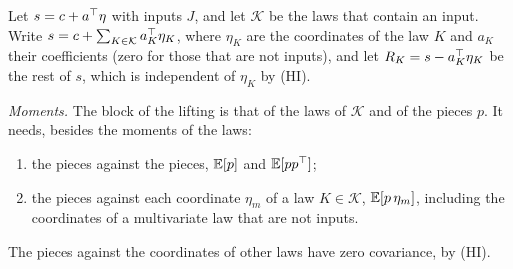 \documentclass[11pt,a4paper]{article}
\numberwithin{equation}{section}
\newcommand{\Hyp}[1]{\textup{(H#1)}}    %
\begin{document}
Let $s = c + a^\top\eta$ with inputs $J$, and let $\mathcal{K}$ be the laws that contain an input.
Write $s = c + \sum_{K \in \mathcal{K}} a_K^\top\eta_K$, where $\eta_K$ are the coordinates of the law $K$ and $a_K$ their coefficients (zero for those that are not inputs),
and let $R_K = s - a_K^\top\eta_K$ be the rest of $s$, which is independent of $\eta_K$ by \Hyp{I}.

\emph{Moments.} The block of the lifting is that of the laws of $\mathcal{K}$ and of the pieces $p$.
It needs, besides the moments of the laws:
\begin{enumerate}[label=(\roman*),nosep]
\item the pieces against the pieces, $\mathbb{E}[p]$ and $\mathbb{E}[pp^\top]$;
\item the pieces against each coordinate $\eta_m$ of a law $K \in \mathcal{K}$, $\mathbb{E}[p\,\eta_m]$, including the coordinates of a multivariate law that are not inputs.
\end{enumerate}
The pieces against the coordinates of other laws have zero covariance, by \Hyp{I}.
\end{document}
